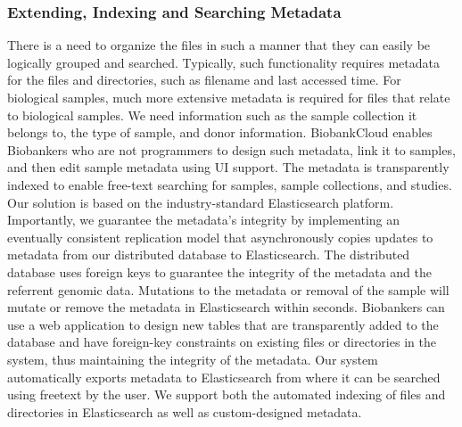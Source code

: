 \subsubsection{Extending, Indexing and Searching Metadata}
There is a need to organize the files in such a manner that they can easily be logically grouped and searched. Typically, such functionality requires metadata for the files and directories, such as filename and last accessed time. For biological samples, much more extensive metadata is required for files that relate to biological samples. We need information such as the sample collection it belongs to, the type of sample, and donor information. BiobankCloud enables Biobankers who are not programmers to design such metadata, link it to samples, and then edit sample metadata using UI support. The metadata is transparently indexed to enable free-text searching for samples, sample collections, and studies. Our solution is based on the industry-standard Elasticsearch platform. Importantly, we guarantee the metadata's integrity by implementing an eventually consistent replication model that asynchronously copies updates to metadata from our distributed database to Elasticsearch. The distributed database uses foreign keys to guarantee the integrity of the metadata and the referrent genomic data. Mutations to the metadata or removal of the sample will mutate or remove the metadata in Elasticsearch within seconds.
Biobankers can use a web application to design new tables that are transparently added to the database and have foreign-key constraints on existing files or directories in the system, thus maintaining the integrity of the metadata. Our system automatically exports metadata to Elasticsearch from where it can be searched using freetext by the user. We support both the automated indexing of files and directories in Elasticsearch as well as custom-designed metadata.
